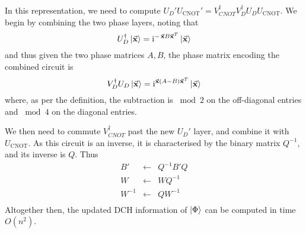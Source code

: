 In this representation, we need to compute $U_{D}'U_{\text{CNOT}}'=V_{CNOT}^{\dagger}V_{D}^{\dagger}U_{D}U_{\text{CNOT}}$. We begin by combining the two phase layers, noting that
\[U_{D}^{\dagger}\ket{\va{x}} = \mathrm{i}^{-\,\va{x}B\va{x}^{T}}\ket{\va{x}}\]
and thus given the two phase matrices $A,B$, the phase matrix encoding the combined circuit is
\[V_{D}^{\dagger}U_{D}\ket{\va{x}}=\mathrm{i}^{\va{x} \left(A-B\right)\va{x}^{T}}\ket{\va{x}}\]
where, as per the definition, the subtraction is $\bmod{2}$ on the off-diagonal entries and $\bmod{4}$ on the diagonal entries.\par
We then need to commute $V_{CNOT}^{\dagger}$ past the new $U_{D}'$ layer, and combine it with $U_{\text{CNOT}}$. As this circuit is an inverse, it is characterised by the binary matrix $Q^{-1}$, and its inverse is $Q$. Thus
\begin{equation}
\begin{array}{rcl}
B' & \gets & Q^{-1}B'Q \\
W & \gets & WQ^{-1}\\
W^{-1} & \gets & QW^{-1} \\
\end{array}
\end{equation}
Altogether then, the updated DCH information of $\ket{\Phi}$ can be computed in time $O(n^{2})$.\par
